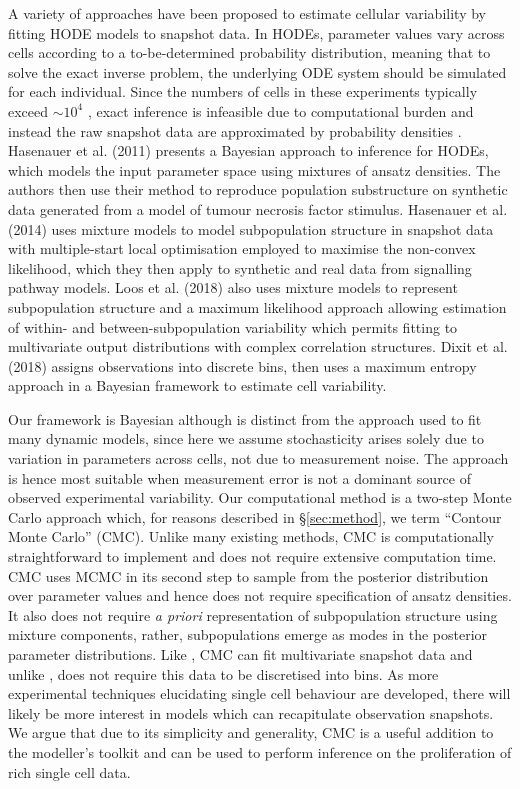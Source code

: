 A variety of approaches have been proposed to estimate cellular variability by fitting HODE models to snapshot data. In HODEs, parameter values vary across cells according to a to-be-determined probability distribution, meaning that to solve the exact inverse problem, the underlying ODE system should be simulated for each individual. Since the numbers of cells in these experiments typically exceed $\sim10^4$ \cite{hasenauer2011identification}, exact inference is infeasible due to computational burden and instead the raw snapshot data are approximated by probability densities \cite{hasenauer2011identification,hasenauer2014ode,loos2018hierarchical,dixit2018maximum}. Hasenauer et al. (2011) presents a Bayesian approach to inference for HODEs, which models the input parameter space using mixtures of ansatz densities. The authors then use their method to reproduce population substructure on synthetic data generated from a model of tumour necrosis factor stimulus. Hasenauer et al. (2014) uses mixture models to model subpopulation structure in snapshot data with multiple-start local optimisation employed to maximise the non-convex likelihood, which they then apply to synthetic and real data from signalling pathway models. Loos et al. (2018) also uses mixture models to represent subpopulation structure and a maximum likelihood approach allowing estimation of within- and between-subpopulation variability which permits fitting to multivariate output distributions with complex correlation structures. Dixit et al. (2018) assigns observations into discrete bins, then uses a maximum entropy approach in a Bayesian framework to estimate cell variability.

Our framework is Bayesian although is distinct from the approach used to fit many dynamic models, since here we assume stochasticity arises solely due to variation in parameters across cells, not due to measurement noise. The approach is hence most suitable when measurement error is not a dominant source of observed experimental variability. Our computational method is a two-step Monte Carlo approach which, for reasons described in \S \ref{sec:method}, we term ``Contour Monte Carlo'' (CMC). Unlike many existing methods, CMC is computationally straightforward to implement and does not require extensive computation time. CMC uses MCMC in its second step to sample from the posterior distribution over parameter values and hence does not require specification of ansatz densities. It also does not require \textit{a priori} representation of subpopulation structure using mixture components, rather, subpopulations emerge as modes in the posterior parameter distributions. Like \cite{loos2018hierarchical}, CMC can fit multivariate snapshot data and unlike \cite{dixit2018maximum}, does not require this data to be discretised into bins. As more experimental techniques elucidating single cell behaviour are developed, there will likely be more interest in models which can recapitulate observation snapshots. We argue that due to its simplicity and generality, CMC is a useful addition to the modeller's toolkit and can be used to perform inference on the proliferation of rich single cell data.


